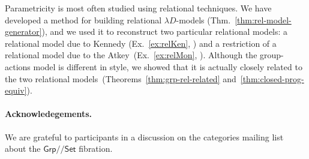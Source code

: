 \documentclass[a4paper,UKenglish]{lipics}
\newcommand{\msf}[1]{\mathsf{#1}} %
\newcommand{\Grp}{\msf{Grp}}
\newcommand{\Set}{\msf{Set}}
\newcommand{\Lslice}[1]{#1/\!/\Set}
\newcommand{\GrpSet}{\Lslice{\Grp}}
\begin{document}
Parametricity is most often studied using relational techniques.
We have developed a method for building relational $\lambda D$-models (Thm.~\ref{thm:rel-model-generator}),
and we used it to reconstruct two particular relational models:
a relational
model due to Kennedy (Ex.~\ref{ex:relKen}, \cite{Kennedy:1997:RPU:263699.263761}) and
a restriction of
a relational
model due to the Atkey~(Ex.~\ref{ex:relMon}, \cite{atkey14conservation}).
Although the group-actions model is different in style,
we showed that it is actually closely related to the
two relational models~(Theorems~\ref{thm:grp-rel-related} and~\ref{thm:closed-prog-equiv}).


\paragraph*{Acknowledegements.}
We are grateful to participants in a discussion on the categories mailing list
about the $\GrpSet$ fibration.
\end{document}
